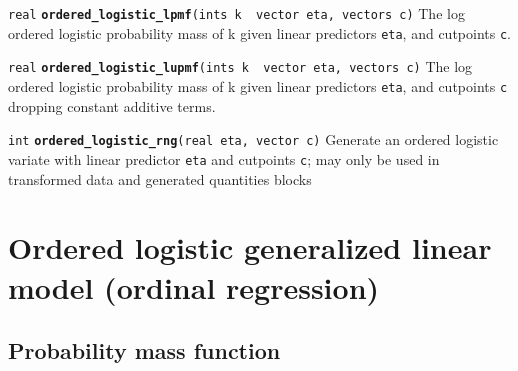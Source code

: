 \documentclass[
  10pt,
]{book}
\begin{document}

\texttt{real} \textbf{\texttt{ordered\_logistic\_lpmf}}\texttt{(ints\ k\ \textbar{}\ vector\ eta,\ vectors\ c)}\newline
The log ordered logistic probability mass of k given linear predictors
\texttt{eta}, and cutpoints \texttt{c}.


\texttt{real} \textbf{\texttt{ordered\_logistic\_lupmf}}\texttt{(ints\ k\ \textbar{}\ vector\ eta,\ vectors\ c)}\newline
The log ordered logistic probability mass of k given linear predictors
\texttt{eta}, and cutpoints \texttt{c} dropping constant additive terms.


\texttt{int} \textbf{\texttt{ordered\_logistic\_rng}}\texttt{(real\ eta,\ vector\ c)}\newline
Generate an ordered logistic variate with linear predictor \texttt{eta} and
cutpoints \texttt{c}; may only be used in transformed data and generated quantities blocks

\hypertarget{ordered-logistic-generalized-linear-model-ordinal-regression}{%
\section{Ordered logistic generalized linear model (ordinal regression)}\label{ordered-logistic-generalized-linear-model-ordinal-regression}}

\hypertarget{probability-mass-function-8}{%
\subsection{Probability mass function}\label{probability-mass-function-8}}
\end{document}
